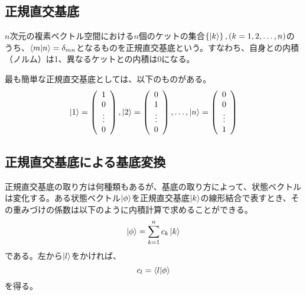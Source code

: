 \subsection{正規直交基底}
$n$次元の複素ベクトル空間における$n$個のケットの集合$\left\{\ket k\right\}, (k = 1, 2, \hdots, n)$のうち、$\braket{m|n} = \delta_{mn}$となるものを正規直交基底という。すなわち、自身との内積（ノルム）は1、異なるケットとの内積は0になる。

最も簡単な正規直交基底としては、以下のものがある。
\begin{equation}
	\ket 1 = \left(\begin{array}{c}
		1 \\ 0 \\ \vdots \\0
	\end{array} \right), 
	\ket 2 = \left(\begin{array}{c}
		0 \\ 1 \\ \vdots \\0
	\end{array} \right), \hdots, 
		\ket n = \left(\begin{array}{c}
		0 \\ 0 \\ \vdots \\1
	\end{array} \right)
\end{equation}

\subsection{正規直交基底による基底変換}
正規直交基底の取り方は何種類もあるが、基底の取り方によって、状態ベクトルは変化する。ある状態ベクトル$\ket \phi$を正規直交基底${\ket k}$の線形結合で表すとき、その重みづけの係数は以下のように内積計算で求めることができる。
\begin{equation}
	\ket \phi = \sum_{k = 1}^n c_k\ket k
	\label{eq:superposition_of_discrete_ket}
\end{equation}
である。左から$\ket l$をかければ、
\begin{equation}
	c_l = \braket{l|\phi}
	\label{eq:coefficient_of_superposition}
\end{equation}
を得る。

